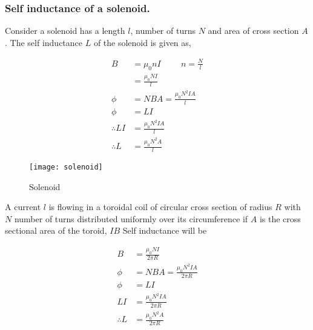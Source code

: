 \subsubsection{Self inductance of a solenoid.}
Consider a solenoid has a length $l$, number of turns $N$ and area of cross section $A$. The  self inductance $L$ of the solenoid is given as,\\
\begin{minipage}{0.65\textwidth}
	\begin{align*}
	B&=\mu_{0}n I\hspace{1cm}n=\frac{N}{l}\\
	&=\frac{{\mu_{0}NI}}{l}\\
	\phi&=N B A=\frac{\mu_{0} N^{2} I A}{l}\\
	\phi&=L I\\
	\therefore L I&=\frac{\mu_{0} N^{2} I A}{l}\\
	\therefore L &=\frac{\mu_{0} N^{2}  A}{l}
	\end{align*}
\end{minipage}
\begin{minipage}{0.35\textwidth}
	\begin{figure}[H]
		\centering
		\texttt{[image: solenoid]}
		\caption{Solenoid}
		\label{Solenoid}
	\end{figure}
\end{minipage}
\begin{exercise}
	A current $l$ is flowing in a toroidal coil of circular cross section of radius $R$ with $N$ number of turns distributed uniformly over its circumference if $A$ is the cross sectional area of the toroid, $I B$ Self inductance will be
\end{exercise}
\begin{answer}
	\begin{align*}
	B&=\frac{\mu_{0} N I}{2 \pi R}\\
	\phi&=N B A=\frac{\mu_{0} N^{2} I A}{2 \pi R}\\
	\phi&=L I\\
	L I&=\frac{\mu_{0} N^{2} I A}{2 \pi R}\\
	\therefore L&=\frac{\mu_{0} N^{2}  A}{2 \pi R}
	\end{align*}
\end{answer}
